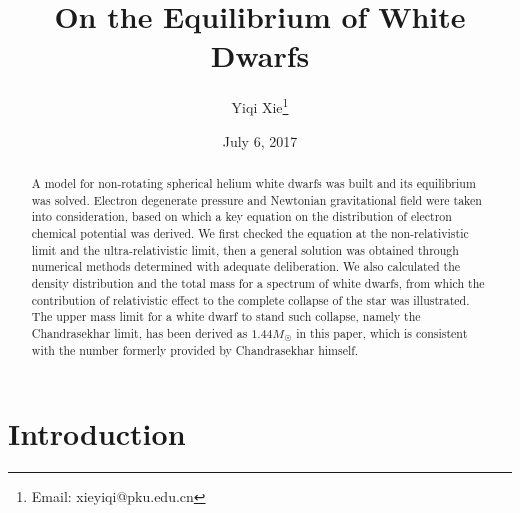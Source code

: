 \documentclass[a4paper,11pt]{article}
\numberwithin{equation}{section}
\numberwithin{table}{section}
\numberwithin{figure}{section}
\begin{document}
	
	
	\title{On the Equilibrium of White Dwarfs}
	\author{Yiqi Xie\thanks{Email: xieyiqi@pku.edu.cn}}
	\date{July 6, 2017}
	\maketitle
	\thispagestyle{empty}
	\begin{abstract}
		A model for non-rotating spherical helium white dwarfs was built and its equilibrium was solved. Electron degenerate pressure and Newtonian gravitational field were taken into consideration, based on which a key equation on the distribution of electron chemical potential was derived. We first checked the equation at the non-relativistic limit and the ultra-relativistic limit, then a general solution was obtained through numerical methods determined with adequate deliberation. We also calculated the density distribution and the total mass for a spectrum of white dwarfs, from which the contribution of relativistic effect to the complete collapse of the star was illustrated. The upper mass limit for a white dwarf to stand such collapse, namely the Chandrasekhar limit, has been derived as $1.44M_{\astrosun}$ in this paper, which is consistent with the number formerly provided by Chandrasekhar himself.
	\end{abstract}
	
	\section{Introduction}
	
\end{document}
